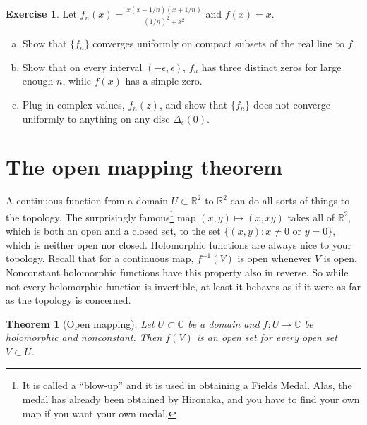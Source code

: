\documentclass[12pt,openany]{book}
\newcommand{\C}{{\mathbb{C}}}
\newcommand{\R}{{\mathbb{R}}}
\newcommand{\myquote}[1]{``#1''}
\theoremstyle{plain}
\newtheorem{thm}{Theorem}[section]
\theoremstyle{remark}
\theoremstyle{definition}
\newenvironment{exbox}{%
    \def\FrameCommand{\vrule width 1pt \relax\hspace{10pt}}%
    \MakeFramed{\advance\hsize-\width\FrameRestore}%
}{%
    \endMakeFramed
}
\newenvironment{exparts}{%
    \leavevmode\begin{enumerate}[a),noitemsep,topsep=0pt,parsep=0pt,partopsep=0pt]
}{%
    \end{enumerate}
}
\theoremstyle{exercise}
\newtheorem{exercise}{Exercise}[section]
\theoremstyle{example}
\begin{document}
\begin{exbox}
\begin{exercise}
Let $f_n(x) = \frac{x(x-1/n)(x+1/n)}{{(1/n)}^2+x^2}$ and $f(x)=x$.
\begin{exparts}
\item
Show that $\{ f_n \}$ converges uniformly on compact subsets of the real
line to $f$.
\item
Show that on every interval $(-\epsilon,\epsilon)$, $f_n$ has three distinct zeros
for large enough $n$, while $f(x)$ has a simple zero.
\item
Plug in complex values, $f_n(z)$, and show that $\{ f_n \}$ does not
converge uniformly to anything on any disc $\Delta_{\epsilon}(0)$.
\end{exparts}
\end{exercise}
\end{exbox}


\section{The open mapping theorem}

A continuous function from a domain $U \subset \R^2$ to $\R^2$ can do all
sorts of things to the topology.  The surprisingly famous\footnote{%
It is called a \myquote{blow-up} and it is used in obtaining a Fields Medal.
Alas, the medal has already been obtained by Hironaka, and you
have to find your own map if you want your own medal.}
map $(x,y) \mapsto (x,xy)$
takes all of $\R^2$, which is both an open and a closed set, to the
set $\bigl\{ (x,y) : x \not= 0 \text{ or } y=0 \bigr\}$, which is neither open nor
closed.
Holomorphic functions are always nice to your topology.
Recall that for a continuous map, $f^{-1}(V)$ is open whenever
$V$ is open.  Nonconstant holomorphic functions have this property also in
reverse.  So while not every holomorphic function is invertible, at least it
behaves as if it were as far as the topology is concerned.


\begin{thm}[Open mapping]\label{thm:OMT}
Let $U \subset \C$ be a domain and $f \colon U \to \C$ be
holomorphic and nonconstant.  Then $f(V)$ is an open set for every open set
$V \subset U$.
\end{thm}
\end{document}
